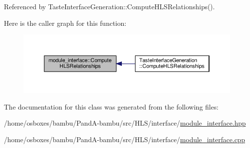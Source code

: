 Referenced by Taste\+Interface\+Generation\+::\+Compute\+H\+L\+S\+Relationships().

Here is the caller graph for this function\+:
\nopagebreak
\begin{figure}[H]
\begin{center}
\leavevmode
\includegraphics[width=350pt]{d9/d0e/classmodule__interface_a48a74ac615057c46e4bc09b05b644e73_icgraph}
\end{center}
\end{figure}


The documentation for this class was generated from the following files\+:\begin{DoxyCompactItemize}
\item 
/home/osboxes/bambu/\+Pand\+A-\/bambu/src/\+H\+L\+S/interface/\hyperlink{module__interface_8hpp}{module\+\_\+interface.\+hpp}\item 
/home/osboxes/bambu/\+Pand\+A-\/bambu/src/\+H\+L\+S/interface/\hyperlink{module__interface_8cpp}{module\+\_\+interface.\+cpp}\end{DoxyCompactItemize}
